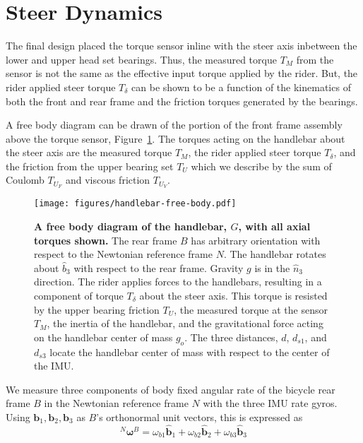 \documentclass[10pt]{article}
\begin{document}
\section*{Steer Dynamics}
\label{sec:steer-dynamics}


The final design placed the torque sensor inline with the steer axis inbetween
the lower and upper head set bearings. Thus, the measured torque $T_M$ from the
sensor is not the same as the effective input torque applied by the rider. But,
the rider applied steer torque $T_\delta$ can be shown to be a function of the
kinematics of both the front and rear frame and the friction torques generated
by the bearings.

A free body diagram can be drawn of the portion of the front frame assembly
above the torque sensor, Figure~\ref{fig:handlebar-free-body}. The torques
acting on the handlebar about the steer axis are the measured torque $T_M$, the
rider applied steer torque $T_\delta$, and the friction from the upper bearing
set $T_U$ which we describe by the sum of Coulomb $T_{U_F}$ and viscous
friction $T_{U_V}$.

\begin{figure}
  \centering
  \texttt{[image: figures/handlebar-free-body.pdf]}
  \caption{{\bf A free body diagram of the handlebar, $G$, with all axial torques
    shown.} The rear frame $B$ has arbitrary orientation with respect to the
    Newtonian reference frame $N$. The handlebar rotates about $\hat{b}_3$ with
    respect to the rear frame. Gravity $g$ is in the $\hat{n}_3$ direction. The
    rider applies forces to the handlebars, resulting in a component of torque
    $T_\delta$ about the steer axis. This torque is resisted by the upper
    bearing friction $T_U$, the measured torque at the sensor $T_M$, the
    inertia of the handlebar, and the gravitational force acting on the
    handlebar center of mass $g_o$. The three distances, $d$, $d_{s1}$, and
    $d_{s3}$ locate the handlebar center of mass with respect to the center of
    the IMU.}
  \label{fig:handlebar-free-body}
\end{figure}

We measure three components of body fixed angular rate of the bicycle rear
frame $B$ in the Newtonian reference frame $N$ with the three IMU rate gyros.
Using $\mathbf{b}_{1},\mathbf{b}_{2},\mathbf{b}_{3}$ as $B$'s orthonormal unit
vectors, this is expressed as
%
\begin{equation}
  ^N\boldsymbol{\omega}^B = \omega_{b1}\hat{\mathbf{b}}_1 +
                            \omega_{b2}\hat{\mathbf{b}}_2 +
                            \omega_{b3}\hat{\mathbf{b}}_3
  \label{eq:rear-frame-angular-rate}
\end{equation}
\end{document}
